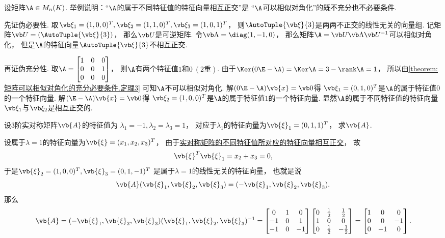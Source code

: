 \begin{example}
设矩阵\(\A \in M_n(K)\).
举例说明：“\(\A\)的属于不同特征值的特征向量相互正交”是
“\(\A\)可以相似对角化”的既不充分也不必要条件.
\begin{solution}
先证伪必要性.
取\(\vb\xi_1 = (1,0,0)^T,
\vb\xi_2 = (1,1,0)^T,
\vb\xi_3 = (1,0,1)^T\)，
则\(\AutoTuple{\vb\xi}{3}\)是两两不正交的线性无关的向量组.
记矩阵\(\P = (\AutoTuple{\vb\xi}{3})\)，
那么\(\P\)是可逆矩阵.
令\(\vb\Lambda = \diag(1,-1,0)\)，
那么矩阵\(\A = \P \vb\Lambda \P^{-1}\)可以相似对角化，
但是\(\A\)的特征向量\(\AutoTuple{\vb\xi}{3}\)不相互正交.

再证伪充分性.
取\(\A = \begin{bmatrix}
	1 & 0 & 0 \\
	0 & 0 & 1 \\
	0 & 0 & 0
\end{bmatrix}\)，
则\(\A\)有两个特征值\(1\)和\(0\ (\text{$2$重})\).
由于\(\Ker(0\E-\A) = \Ker\A = 3 - \rank\A = 1\)，
所以由\cref{theorem:矩阵可以相似对角化的充分必要条件.定理3} 可知\(\A\)不可以相似对角化.
解\((0\E-\A) \vb{x} = \vb0\)得
\(\vb\xi_1 = (0,1,0)^T\)是\(\A\)的属于特征值\(0\)的一个特征向量.
解\((\E-\A) \vb{x} = \vb0\)得
\(\vb\xi_2 = (1,0,0)^T\)是\(\A\)的属于特征值\(1\)的一个特征向量.
显然\(\A\)的属于不同特征值的特征向量\(\vb\xi_1\)与\(\vb\xi_2\)是相互正交的.
\end{solution}
\end{example}

\begin{example}
设3阶实对称矩阵\(\vb{A}\)的特征值为
\(\lambda_1=-1,\lambda_2=\lambda_3=1\)，
对应于\(\lambda_1\)的特征向量为\(\vb{\xi}_1=(0,1,1)^T\)，
求\(\vb{A}\).
\begin{solution}
设属于\(\lambda=1\)的特征向量为\(\vb{\xi}=(x_1,x_2,x_3)^T\)，
由于\hyperref[theorem:特征值与特征向量.实对称矩阵2]{实对称矩阵的不同特征值所对应的特征向量相互正交}，
故\[
	\vb{\xi}^T \vb{\xi}_1 = x_2+x_3 = 0,
\]
于是\(\vb{\xi}_2=(1,0,0)^T,
\vb{\xi}_3=(0,1,-1)^T\)
是属于\(\lambda=1\)的线性无关的特征向量，
也就是说\[
	\vb{A}(\vb{\xi}_1,\vb{\xi}_2,\vb{\xi}_3)
	=(-\vb{\xi}_1,\vb{\xi}_2,\vb{\xi}_3).
\]
那么\[
	\vb{A}
	=(-\vb{\xi}_1,\vb{\xi}_2,\vb{\xi}_3)
	(\vb{\xi}_1,\vb{\xi}_2,\vb{\xi}_3)^{-1}
	=\begin{bmatrix}
		0 & 1 & 0 \\
		-1 & 0 & 1 \\
		-1 & 0 & -1
	\end{bmatrix}
	\begin{bmatrix}
		0 & \frac{1}{2} & \frac{1}{2} \\
		1 & 0 & 0 \\
		0 & \frac{1}{2} & -\frac{1}{2}
	\end{bmatrix}
	=\begin{bmatrix}
		1 & 0 & 0 \\
		0 & 0 & -1 \\
		0 & -1 & 0
	\end{bmatrix}.
\]
\end{solution}
\end{example}

